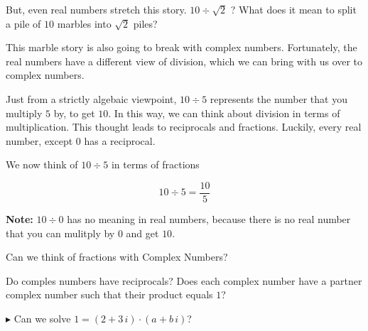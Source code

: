 \documentclass{ximera}
\begin{document}
But, even real numbers stretch this story.  $10 \div \sqrt{2}$ ?  What does it mean to split a pile of $10$ marbles into $\sqrt{2}$ piles?

This marble story is also going to break with complex numbers.  Fortunately, the real numbers have a different view of division, which we can bring with us over to complex numbers.





Just from a strictly algebaic viewpoint, $10 \div 5$ represents the number that you multiply $5$ by, to get $10$.  In this way, we can think about division in terms of multiplication.  This thought leads to reciprocals and fractions.  Luckily, every real number, except $0$ has a reciprocal.  

We now think of $10 \div 5$ in terms of fractions

\[  10 \div 5 = \frac{10}{5}  \] 


\textbf{Note:}  $10 \div 0$ has no meaning in real numbers, because there is no real number that you can mulitply by $0$ and get $10$. 




Can we think of fractions with Complex Numbers?




Do comples numbers have reciprocals?  Does each complex number have a partner complex number such that their product equals $1$?



 $\blacktriangleright$ Can we solve $1 = (2 + 3 \, i) \cdot (a + b \, i)  $?
\end{document}
